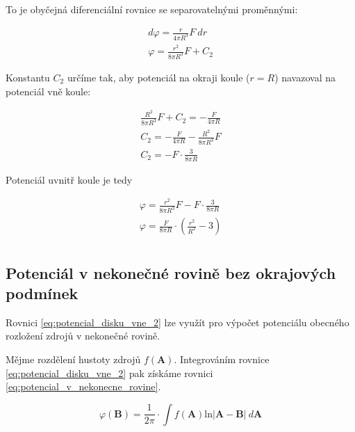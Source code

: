 \documentclass{book}
\newcommand{\vect}[1]{\boldsymbol{#1}}
\begin{document}
To je obyčejná diferenciální rovnice se separovatelnými proměnnými:

\begin{equation}
\label{eq:potencial_disku_uvnitr}
\begin{split}
d \varphi = \frac{r}{4 \pi R^3} F \ dr \\
\varphi = \frac{r^2}{8 \pi R^3} F + C_2
\end{split}
\end{equation}

Konstantu \(C_2\) určíme tak, aby potenciál na okraji koule (\(r = R\)) navazoval na potenciál vně koule:

\begin{equation}
\begin{split}
\frac{R^2}{8 \pi R^3} F + C_2 = -\frac{F}{4 \pi R} \\
C_2 = -\frac{F}{4 \pi R} - \frac{R^2}{8 \pi R^3} F \\
C_2 = -F \cdot \frac{3}{8 \pi R}
\end{split}
\end{equation}

Potenciál uvnitř koule je tedy

\begin{equation}
\begin{split}
\varphi = \frac{r^2}{8 \pi R^3} F - F \cdot \frac{3}{8 \pi R} \\
\varphi = \frac{F}{8 \pi R} \cdot \left(\frac{r^2}{R^2} - 3 \right) \\
\end{split}
\end{equation}


\subsection{Potenciál v nekonečné rovině bez okrajových podmínek}

Rovnici \eqref{eq:potencial_disku_vne_2} lze využít pro výpočet potenciálu obecného rozložení zdrojů v nekonečné rovině.

Mějme rozdělení hustoty zdrojů \(f(\vect{A})\). Integrováním rovnice \eqref{eq:potencial_disku_vne_2} pak získáme rovnici \eqref{eq:potencial_v_nekonecne_rovine}.

\begin{equation}
\label{eq:potencial_v_nekonecne_rovine}
\varphi(\vect{B}) = \frac{1}{2 \pi} \cdot \int f(\vect{A}) \mathrm{ln} |\vect{A} - \vect{B}| \ d\vect{A}
\end{equation}
\end{document}
